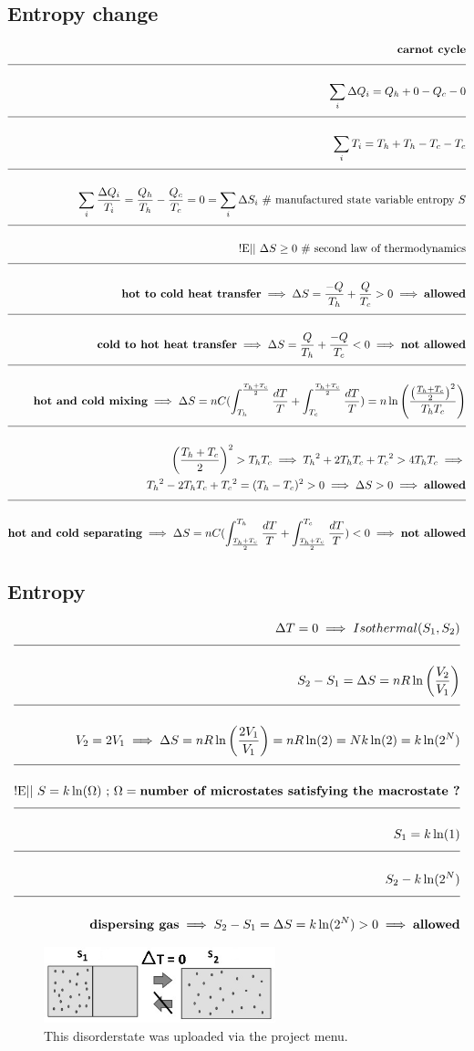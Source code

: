 \documentclass[a4paper]{article}
\newcommand{\eqComment}[1]{\text{  \# #1}}
\newcommand{\eqSep}{\text{ ;  }}
\newcommand{\experimental}{\text{!E||  }}
\newcommand{\n}{\\[1.5ex] \hline \nonumber \\[0ex]}
\newcommand{\m}{\nonumber \\}
\begin{document}
\subsection{Entropy change}
\begin{tcolorbox}
\begin{align}
   \textbf{carnot cycle}
\n \sum_i \Delta Q_i = Q_h + 0 - Q_c - 0
\n \sum_i T_i = T_h + T_h - T_c - T_c
\n \sum_i \frac{\Delta Q_i}{T_i} = \frac{Q_h}{T_h} - \frac{Q_c}{T_c} = 0 = \sum_i \Delta S_i \eqComment{manufactured state variable entropy $S$}
\n \experimental \Delta S \geq 0 \eqComment{second law of thermodynamics}
\n \textbf{hot to cold heat transfer} \implies \Delta S = \frac{-Q}{T_h} + \frac{Q}{T_c} > 0 \implies \textbf{allowed}
\n \textbf{cold to hot heat transfer} \implies \Delta S = \frac{Q}{T_h} + \frac{-Q}{T_c} < 0 \implies \textbf{not allowed}
\n \textbf{hot and cold mixing} \implies \Delta S = n C (\int_{T_h}^{\frac{T_h + T_c}{2}}\frac{dT}{T} + \int_{T_c}^{\frac{T_h + T_c}{2}}\frac{dT}{T}) = n \ln\left(\frac{\left(\frac{T_h + T_c}{2}\right)^2}{T_h T_c}\right)
\n \left(\frac{T_h + T_c}{2}\right)^2 > T_h T_c \implies {T_h}^2 + 2 T_h T_c + {T_c}^2 > 4 T_h T_c \implies
\m {T_h}^2 - 2 T_h T_c + {T_c}^2 = (T_h - T_c)^2 > 0 \implies \Delta S > 0 \implies \textbf{allowed}
\n \textbf{hot and cold separating} \implies \Delta S = n C (\int_{\frac{T_h + T_c}{2}}^{T_h}\frac{dT}{T} + \int_{\frac{T_h + T_c}{2}}^{T_c}\frac{dT}{T}) < 0 \implies \textbf{not allowed}
\end{align}
\end{tcolorbox}

\subsection{Entropy}
\begin{tcolorbox}
\begin{align}
   \Delta T = 0 \implies Isothermal(S_1, S_2)
\n S_2 - S_1 = \Delta S = n R \ln\left(\frac{V_2}{V_1}\right)
\n V_2 = 2 V_1 \implies \Delta S = n R \ln\left(\frac{2 V_1}{V_1}\right) = n R \ln(2) = N k \ln(2) = k \ln(2^N)
\n \experimental S = k \ln(\Omega) \eqSep \Omega = \textbf{number of microstates satisfying the macrostate ?}
\n S_1 = k \ln(1)
\n S_2 - k \ln(2^N)
\n \textbf{dispersing gas} \implies S_2 - S_1 = \Delta S = k \ln(2^N) > 0 \implies \textbf{allowed}
\end{align}
\end{tcolorbox}

\begin{figure}[h]
\centering
\includegraphics[width=0.6\textwidth]{figures/disorderstate.jpg}
\caption{\label{fig:disorderstate}This disorderstate was uploaded via the project menu.}
\end{figure} \FloatBarrier
\end{document}
